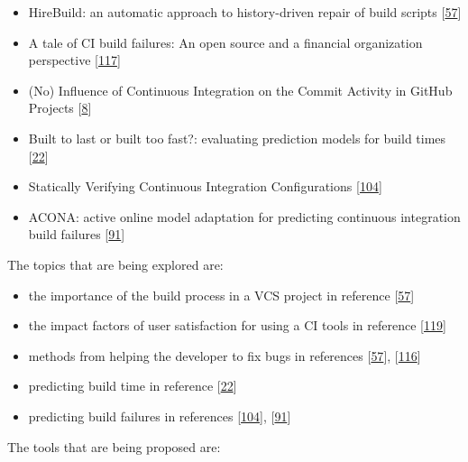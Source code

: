 \documentclass[]{book}
\providecommand{\tightlist}{%
  \setlength{\itemsep}{0pt}\setlength{\parskip}{0pt}}
\begin{document}
\begin{itemize}
\tightlist
\item
  HireBuild: an automatic approach to history-driven repair of build
  scripts {[}\protect\hyperlink{ref-hassan2018hirebuild}{57}{]}
\item
  A tale of CI build failures: An open source and a financial
  organization perspective
  {[}\protect\hyperlink{ref-vassallo2017tale}{117}{]}
\item
  (No) Influence of Continuous Integration on the Commit Activity in
  GitHub Projects {[}\protect\hyperlink{ref-baltes2018no}{8}{]}
\item
  Built to last or built too fast?: evaluating prediction models for
  build times {[}\protect\hyperlink{ref-bisong2017built}{22}{]}
\item
  Statically Verifying Continuous Integration Configurations
  {[}\protect\hyperlink{ref-santolucito2018statically}{104}{]}
\item
  ACONA: active online model adaptation for predicting continuous
  integration build failures
  {[}\protect\hyperlink{ref-ni2018acona}{91}{]}
\end{itemize}

The topics that are being explored are:

\begin{itemize}
\tightlist
\item
  the importance of the build process in a VCS project in reference
  {[}\protect\hyperlink{ref-hassan2018hirebuild}{57}{]}
\item
  the impact factors of user satisfaction for using a CI tools in
  reference {[}\protect\hyperlink{ref-widder2018m}{119}{]}
\item
  methods from helping the developer to fix bugs in references
  {[}\protect\hyperlink{ref-hassan2018hirebuild}{57}{]},
  {[}\protect\hyperlink{ref-vassallo2018break}{116}{]}
\item
  predicting build time in reference
  {[}\protect\hyperlink{ref-bisong2017built}{22}{]}
\item
  predicting build failures in references
  {[}\protect\hyperlink{ref-santolucito2018statically}{104}{]},
  {[}\protect\hyperlink{ref-ni2018acona}{91}{]}
\end{itemize}

The tools that are being proposed are:
\end{document}
